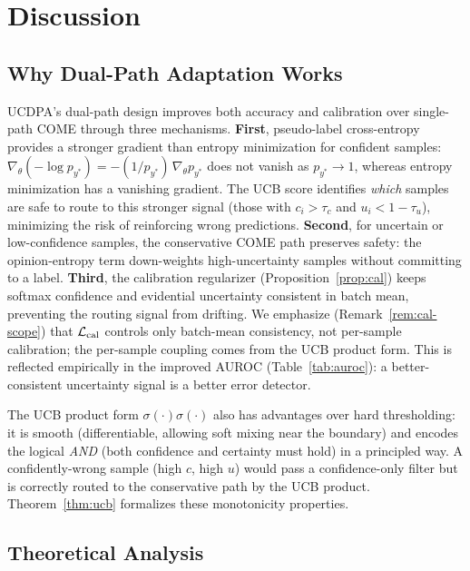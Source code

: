 \section{Discussion}
\label{sec:discussion}

\subsection{Why Dual-Path Adaptation Works}
\label{sec:disc:why-dual}

UCDPA's dual-path design improves both accuracy and calibration over single-path COME through three mechanisms. \textbf{First}, pseudo-label cross-entropy provides a stronger gradient than entropy minimization for confident samples: $\nabla_\theta (-\log p_{y^*}) = -(1/p_{y^*})\,\nabla_\theta p_{y^*}$ does not vanish as $p_{y^*} \to 1$, whereas entropy minimization has a vanishing gradient. The UCB score identifies \emph{which} samples are safe to route to this stronger signal (those with $c_i > \tau_c$ and $u_i < 1 - \tau_u$), minimizing the risk of reinforcing wrong predictions. \textbf{Second}, for uncertain or low-confidence samples, the conservative COME path preserves safety: the opinion-entropy term down-weights high-uncertainty samples without committing to a label. \textbf{Third}, the calibration regularizer (Proposition~\ref{prop:cal}) keeps softmax confidence and evidential uncertainty consistent in batch mean, preventing the routing signal from drifting. We emphasize (Remark~\ref{rem:cal-scope}) that $\mathcal{L}_\mathrm{cal}$ controls only batch-mean consistency, not per-sample calibration; the per-sample coupling comes from the UCB product form. This is reflected empirically in the improved AUROC (Table~\ref{tab:auroc}): a better-consistent uncertainty signal is a better error detector.

The UCB product form $\sigma(\cdot)\sigma(\cdot)$ also has advantages over hard thresholding: it is smooth (differentiable, allowing soft mixing near the boundary) and encodes the logical \emph{AND} (both confidence and certainty must hold) in a principled way. A confidently-wrong sample (high $c$, high $u$) would pass a confidence-only filter but is correctly routed to the conservative path by the UCB product. Theorem~\ref{thm:ucb} formalizes these monotonicity properties.

\subsection{Theoretical Analysis}
\label{sec:disc:theory}

